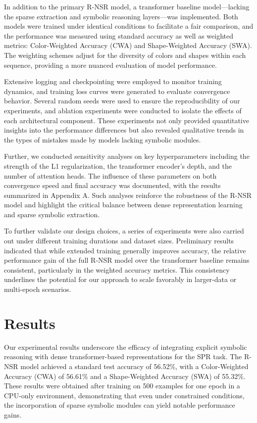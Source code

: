 \documentclass{article}
\begin{document}
In addition to the primary R-NSR model, a transformer baseline model—lacking the sparse extraction and symbolic reasoning layers—was implemented. Both models were trained under identical conditions to facilitate a fair comparison, and the performance was measured using standard accuracy as well as weighted metrics: Color-Weighted Accuracy (CWA) and Shape-Weighted Accuracy (SWA). The weighting schemes adjust for the diversity of colors and shapes within each sequence, providing a more nuanced evaluation of model performance.

Extensive logging and checkpointing were employed to monitor training dynamics, and training loss curves were generated to evaluate convergence behavior. Several random seeds were used to ensure the reproducibility of our experiments, and ablation experiments were conducted to isolate the effects of each architectural component. These experiments not only provided quantitative insights into the performance differences but also revealed qualitative trends in the types of mistakes made by models lacking symbolic modules.

Further, we conducted sensitivity analyses on key hyperparameters including the strength of the L1 regularization, the transformer encoder’s depth, and the number of attention heads. The influence of these parameters on both convergence speed and final accuracy was documented, with the results summarized in Appendix A. Such analyses reinforce the robustness of the R-NSR model and highlight the critical balance between dense representation learning and sparse symbolic extraction.

To further validate our design choices, a series of experiments were also carried out under different training durations and dataset sizes. Preliminary results indicated that while extended training generally improves accuracy, the relative performance gain of the full R-NSR model over the transformer baseline remains consistent, particularly in the weighted accuracy metrics. This consistency underlines the potential for our approach to scale favorably in larger-data or multi-epoch scenarios.

\section{Results}
Our experimental results underscore the efficacy of integrating explicit symbolic reasoning with dense transformer-based representations for the SPR task. The R-NSR model achieved a standard test accuracy of 56.52\%, with a Color-Weighted Accuracy (CWA) of 56.61\% and a Shape-Weighted Accuracy (SWA) of 55.32\%. These results were obtained after training on 500 examples for one epoch in a CPU-only environment, demonstrating that even under constrained conditions, the incorporation of sparse symbolic modules can yield notable performance gains.
\end{document}
